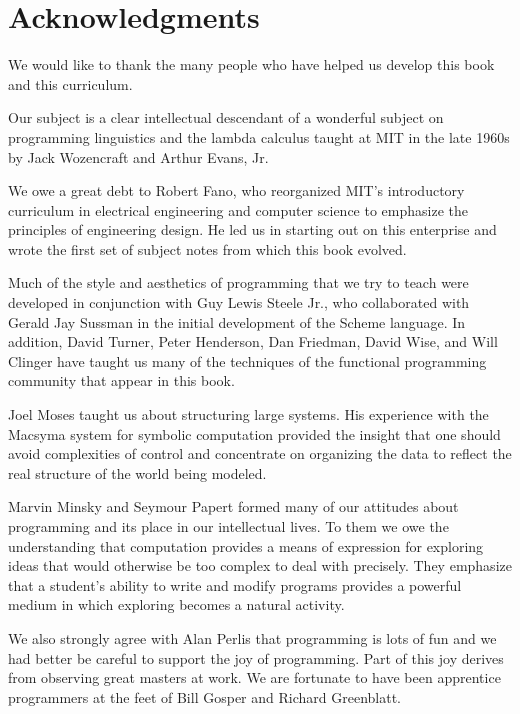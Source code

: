
\chapter[chap:acknowledgments]{Acknowledgments}

We would like to thank the many people who have helped us develop this book and this curriculum.

Our subject is a clear intellectual descendant of 
a wonderful subject on programming linguistics and the lambda calculus
taught at MIT in the late 1960s by Jack Wozencraft and Arthur Evans, Jr.

We owe a great debt to Robert Fano,
who reorganized MIT's introductory curriculum in electrical engineering
and computer science to emphasize the principles of engineering design.
He led us in starting out on this enterprise and wrote the first set of subject notes from which this book evolved.

Much of the style and aesthetics of programming that we try to teach were developed
in conjunction with Guy Lewis Steele Jr.,
who collaborated with Gerald Jay Sussman in the initial development of the Scheme language.
In addition, David Turner, Peter Henderson, Dan Friedman, David Wise, and Will Clinger
have taught us many of the techniques of the functional programming community that appear in this book.

Joel Moses taught us about structuring large systems.
His experience with the Macsyma system for symbolic computation provided the insight that
one should avoid complexities of control
and concentrate on organizing the data to reflect the real structure of the world being modeled.

Marvin Minsky and Seymour Papert formed many of our attitudes
about programming and its place in our intellectual lives.
To them we owe the understanding that computation provides a means of expression for exploring ideas
that would otherwise be too complex to deal with precisely.
They emphasize that a student's ability to write and modify programs provides a powerful medium
in which exploring becomes a natural activity.

We also strongly agree with Alan Perlis that
programming is lots of fun and we had better be careful to support the joy of programming.
Part of this joy derives from observing great masters at work.
We are fortunate to have been apprentice programmers at the feet of Bill Gosper and Richard Greenblatt.

